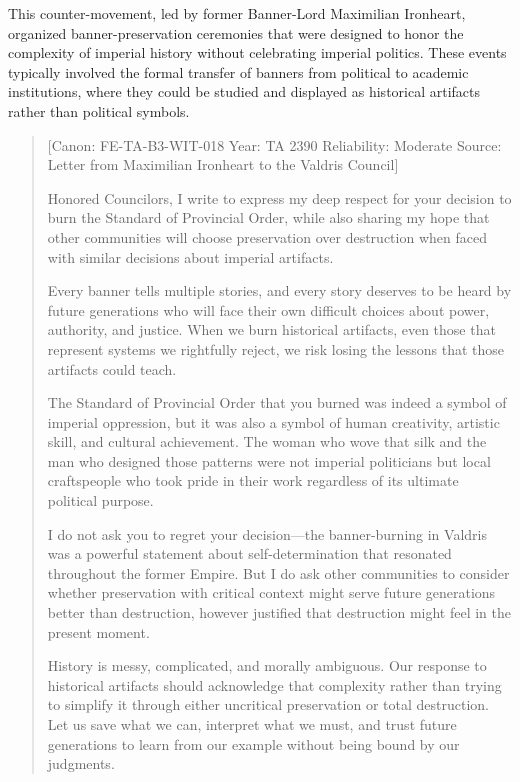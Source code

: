 This counter-movement, led by former Banner-Lord Maximilian Ironheart,
organized banner-preservation ceremonies that were designed to honor the
complexity of imperial history without celebrating imperial politics.
These events typically involved the formal transfer of banners from
political to academic institutions, where they could be studied and
displayed as historical artifacts rather than political symbols.

\begin{quote}
{[}Canon: FE-TA-B3-WIT-018 \textbar{} Year: TA 2390 \textbar{}
Reliability: Moderate \textbar{} Source: Letter from Maximilian
Ironheart to the Valdris Council{]}

Honored Councilors, I write to express my deep respect for your decision
to burn the Standard of Provincial Order, while also sharing my hope
that other communities will choose preservation over destruction when
faced with similar decisions about imperial artifacts.

Every banner tells multiple stories, and every story deserves to be
heard by future generations who will face their own difficult choices
about power, authority, and justice. When we burn historical artifacts,
even those that represent systems we rightfully reject, we risk losing
the lessons that those artifacts could teach.

The Standard of Provincial Order that you burned was indeed a symbol of
imperial oppression, but it was also a symbol of human creativity,
artistic skill, and cultural achievement. The woman who wove that silk
and the man who designed those patterns were not imperial politicians
but local craftspeople who took pride in their work regardless of its
ultimate political purpose.

I do not ask you to regret your decision---the banner-burning in Valdris
was a powerful statement about self-determination that resonated
throughout the former Empire. But I do ask other communities to consider
whether preservation with critical context might serve future
generations better than destruction, however justified that destruction
might feel in the present moment.

History is messy, complicated, and morally ambiguous. Our response to
historical artifacts should acknowledge that complexity rather than
trying to simplify it through either uncritical preservation or total
destruction. Let us save what we can, interpret what we must, and trust
future generations to learn from our example without being bound by our
judgments.
\end{quote}

